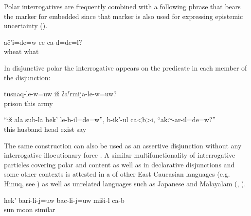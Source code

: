 Polar interrogatives are frequently combined with a following phrase that bears the marker for embedded   since that marker is also used for expressing epistemic uncertainty ().

\begin{exe}
	\ex	\label{ex:Was it wheat or something else}
	\gll	ač'i=de=w	ce	ca-d=de=l?\\
		wheat	what	\\
	\glt	{}
\end{exe}

In disjunctive polar  the interrogative  appears on the predicate in each member of the disjunction:

\begin{exe}
	\ex	\label{ex:Is he in a prison or in the army}
	\gll	tusnaq-le-w=uw	iž	ʡaˁrmija-le-w=uw?\\
		prison	this	army\\
	\glt	{}

	\ex	\label{ex:‎They say to the wife, Did your husband have a head or not}
	\gll	``iž	ala	sub-la	bek'	le-b-il=de=w'',	b-ik'-ul	ca<b>i,	``akːʷ-ar-il=de=w?''	\\
		this		husband	head	exist	say		\\
	\glt	{}
\end{exe}

The same construction can also be used as an assertive disjunction without any interrogative illocutionary force . A similar multifunctionality of interrogative particles covering polar and content  as well as in declarative disjunctions and some other contexts is attested in a  of other East Caucasian languages (e.g. Hinuq, see ) as well as unrelated languages such as Japanese and Malayalam (\citealp[2]{Slade2011}, ). 

\begin{exe}
	\ex	\label{ex:This is similar to the sun or the moon}
	\gll	hek'	bari-li-j=uw	bac-li-j=uw	miši-l	ca-b\\
			sun	moon	similar	\\
	\glt	{}
\end{exe}


